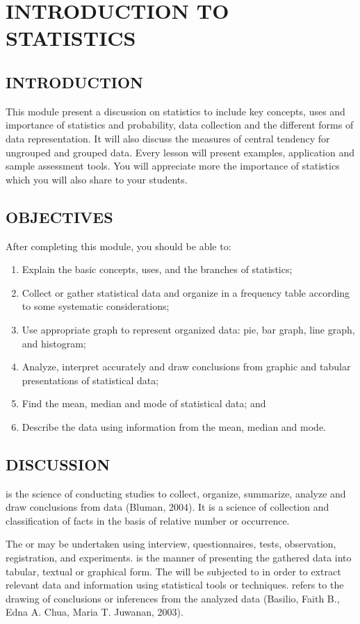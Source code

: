 \chapter{INTRODUCTION TO STATISTICS}
\section*{INTRODUCTION}
This module present a discussion on statistics to include key concepts, uses and
importance of statistics and probability, data collection and the different forms of data
representation. It will also discuss the measures of central tendency for ungrouped and grouped
data. Every lesson will present examples, application and sample assessment tools. You will
appreciate more the importance of statistics which you will also share to your students.
\section*{OBJECTIVES}
After completing this module, you should be able to:
\begin{enumerate}
\item Explain the basic concepts, uses, and the branches of statistics;
\item Collect or gather statistical data and organize in a frequency table according to some
systematic considerations;
\item Use appropriate graph to represent organized data: pie, bar graph, line graph, and
histogram;
\item Analyze, interpret accurately and draw conclusions from graphic and tabular
presentations of statistical data;
\item Find the mean, median and mode of statistical data; and
\item Describe the data using information from the mean, median and mode.
\end{enumerate}
\section*{DISCUSSION}
\begin{definition}[Statistics]
 is the science of conducting studies to collect, organize, summarize,
analyze and draw conclusions from data (Bluman, 2004). It is a science of
collection and classification of facts in the basis of relative number or
occurrence.
\end{definition}
The  or  may be undertaken using interview, questionnaires,
tests, observation, registration, and experiments.  is the manner of
presenting the gathered data into tabular, textual or graphical form. The  will
be subjected to  in order to extract relevant data and information using statistical tools
or techniques.  refers to the drawing of conclusions or inferences from
the analyzed data (Basilio, Faith B., Edna A. Chua, Maria T. Juwanan, 2003).
